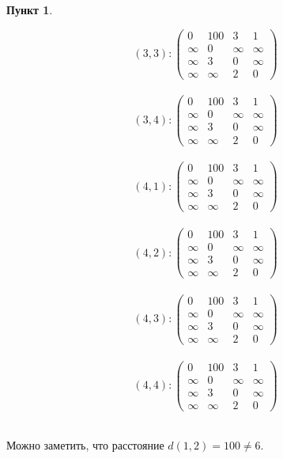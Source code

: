 \documentclass[11pt,a4paper]{scrarticle}
\theoremstyle{definition}
\newtheorem{subtask}{Пункт}
\begin{document}
\begin{subtask}
\begin{multicols}{2}
        $$(3, 3): \begin{pmatrix}
                0      & 100    & 3      & 1      \\
                \infty & 0      & \infty & \infty \\
                \infty & 3      & 0      & \infty \\
                \infty & \infty & 2      & 0
            \end{pmatrix}$$\\
        $$(3, 4): \begin{pmatrix}
                0      & 100    & 3      & 1      \\
                \infty & 0      & \infty & \infty \\
                \infty & 3      & 0      & \infty \\
                \infty & \infty & 2      & 0
            \end{pmatrix}$$\\
        $$(4, 1): \begin{pmatrix}
                0      & 100    & 3      & 1      \\
                \infty & 0      & \infty & \infty \\
                \infty & 3      & 0      & \infty \\
                \infty & \infty & 2      & 0
            \end{pmatrix}$$\\
        $$(4, 2): \begin{pmatrix}
                0      & 100    & 3      & 1      \\
                \infty & 0      & \infty & \infty \\
                \infty & 3      & 0      & \infty \\
                \infty & \infty & 2      & 0
            \end{pmatrix}$$\\
        $$(4, 3): \begin{pmatrix}
                0      & 100    & 3      & 1      \\
                \infty & 0      & \infty & \infty \\
                \infty & 3      & 0      & \infty \\
                \infty & \infty & 2      & 0
            \end{pmatrix}$$\\
        $$(4, 4): \begin{pmatrix}
                0      & 100    & 3      & 1      \\
                \infty & 0      & \infty & \infty \\
                \infty & 3      & 0      & \infty \\
                \infty & \infty & 2      & 0
            \end{pmatrix}$$\\
    \end{multicols}

    Можно заметить, что расстояние $d(1, 2) = 100 \neq 6$.
\end{subtask}
\end{document}
